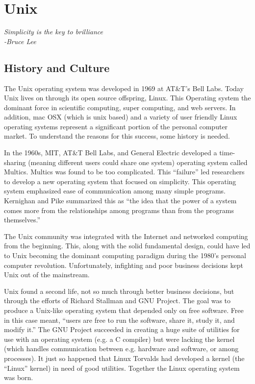 \chapter[Unix]{Unix} 
\label{chapter:unix}
\begin{center}
{\Large\textit{Simplicity is the key to brilliance\\-Bruce Lee}}
\end{center}
\vspace{0.2in}

\section{History and Culture} 
\label{unix:history} 
The Unix operating system was developed in 1969 at AT\&T's Bell Labs.  Today Unix lives on through its open source offspring, Linux.  This Operating system the dominant force in scientific computing, super computing, and web servers.  In addition, mac OSX (which is unix based) and a variety of user friendly Linux operating systems represent a significant portion of the personal computer market.  To understand the reasons for this success, some history is needed.

In the 1960s, MIT, AT\&T Bell Labs, and General Electric developed a time-sharing (meaning different users could share one system) operating system called Multics.  Multics was found to be too complicated.  This ``failure'' led researchers to develop a new operating system that focused on simplicity.  This operating system emphasized ease of communication among many simple programs.  Kernighan and Pike summarized this as ``the idea that the power of a system comes more from the relationships among programs than from the programs themselves.''

The Unix community was integrated with the Internet and networked computing from the beginning.  This, along with the solid fundamental design, could have led to Unix becoming the dominant computing paradigm during the 1980's personal computer revolution.  Unfortunately, infighting and poor business decisions kept Unix out of the mainstream.  

Unix found a second life, not so much through better business decisions, but through the efforts of Richard Stallman and GNU Project.  The goal was to produce a Unix-like operating system that depended only on free software.  Free in this case meant, ``users are free to run the software, share it, study it, and modify it.''  The GNU Project succeeded in creating a huge suite of utilities for use with an operating system (e.g. a C compiler) but were lacking the kernel (which handles communication between e.g. hardware and software, or among processes).  It just so happened that Linux Torvalds had developed a kernel (the ``Linux'' kernel) in need of good utilities.  Together the Linux operating system was born.  

